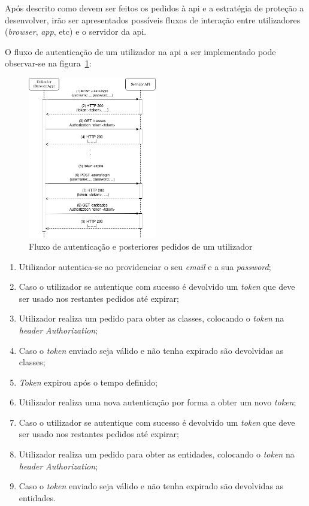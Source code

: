 Após descrito como devem ser feitos os pedidos à \acrshort{api} e a estratégia de proteção a desenvolver, irão ser 
apresentados possíveis fluxos de interação entre utilizadores (\textit{browser}, \textit{app}, etc) e o 
servidor da \acrshort{api}.

O fluxo de autenticação de um utilizador na \acrshort{api} a ser implementado pode observar-se na figura~\ref{fig:userAuth}:
\begin{figure}[H]
    \centering
    \includegraphics[width=0.5\textwidth]{img/userAuth.png}
    \caption{Fluxo de autenticação e posteriores pedidos de um utilizador}\label{fig:userAuth}
\end{figure}

\begin{enumerate}
    \item Utilizador autentica-se ao providenciar o seu \textit{email} e a sua \textit{password};
    \item Caso o utilizador se autentique com sucesso é devolvido um \textit{token} que deve ser usado nos 
    restantes pedidos até expirar;
    \item Utilizador realiza um pedido para obter as classes, colocando o \textit{token} na \textit{header} 
    \textit{Authorization};
    \item Caso o \textit{token} enviado seja válido e não tenha expirado são devolvidas as classes;
    \item \textit{Token} expirou após o tempo definido;
    \item Utilizador realiza uma nova autenticação por forma a obter um novo \textit{token};
    \item Caso o utilizador se autentique com sucesso é devolvido um \textit{token} que deve ser usado nos 
    restantes pedidos até expirar;
    \item Utilizador realiza um pedido para obter as entidades, colocando o \textit{token} na 
    \textit{header} \textit{Authorization};
    \item Caso o \textit{token} enviado seja válido e não tenha expirado são devolvidas as entidades.
\end{enumerate}

